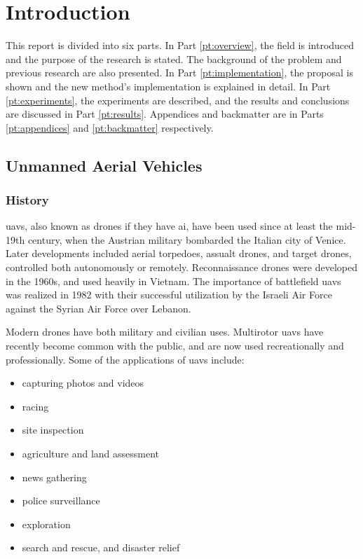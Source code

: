 \chapter{Introduction}
\label{ch:intro}

This report is divided into six parts.
In Part \ref{pt:overview}, the field is introduced and the purpose of the research is stated.
The background of the problem and previous research are also presented.
In Part \ref{pt:implementation}, the proposal is shown and the new method's implementation is explained in detail.
In Part \ref{pt:experiments}, the experiments are described, and the results and conclusions are discussed in Part \ref{pt:results}.
Appendices and backmatter are in Parts \ref{pt:appendices} and \ref{pt:backmatter} respectively.

\section{Unmanned Aerial Vehicles}
\subsection{History}
\Glspl{uav}, also known as drones if they have \gls{ai}, have been used since at least the mid-19th century, when the Austrian military bombarded the Italian city of Venice.\cite{monash2003}
Later developments included aerial torpedoes, assualt drones, and target drones, controlled both autonomously or remotely.
Reconnaissance drones were developed in the 1960s, and used heavily in Vietnam.
The importance of battlefield \glspl{uav} was realized in 1982 with their successful utilization by the Israeli Air Force against the Syrian Air Force over Lebanon.\cite{draganfly2009}

Modern drones have both military and civilian uses.
Multirotor \glspl{uav} have recently become common with the public, and are now used recreationally and professionally.
Some of the applications of \glspl{uav} include:

\begin{itemize}
  \item capturing photos and videos
  \item racing
  \item site inspection
  \item agriculture and land assessment
  \item news gathering
  \item police surveillance
  \item exploration
  \item search and rescue, and disaster relief
\end{itemize}

